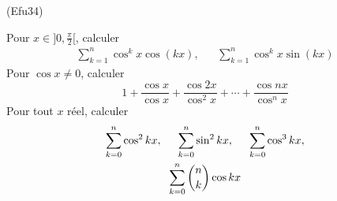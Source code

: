 \begin{tiny}(Efu34)\end{tiny} Pour $x\in ]0,\frac{\pi}{2}[$, calculer
\begin{align*}
 \sum_{k=1}^n \cos^k x \cos(kx), & & \sum_{k=1}^n \cos^k x \sin(kx) 
\end{align*}
Pour $\cos x \neq 0$, calculer
\begin{displaymath}
 1+\frac{\cos x}{\cos x} + \frac{\cos 2x}{\cos^2x}+\cdots + \frac{\cos nx}{\cos^n x}
\end{displaymath}
Pour tout $x$ réel, calculer
\begin{multline*}
 \sum_{k=0}^n\cos^2kx,\hspace{0.5cm}\sum_{k=0}^n\sin^2kx,\hspace{0.5cm}\sum_{k=0}^n\cos^3 kx,\\
 \sum_{k=0}^n\binom{n}{k}\cos kx
\end{multline*}
